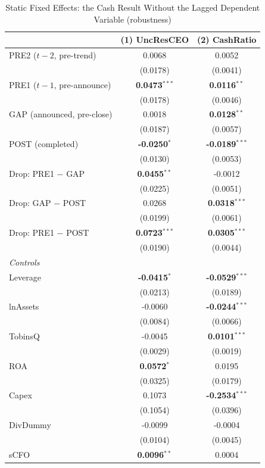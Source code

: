 \begin{table}[htbp]
\centering
\caption{Static Fixed Effects: the Cash Result Without the Lagged Dependent Variable (robustness)}
\label{tab:empire_drop_staticfe}
\scriptsize
\begin{tabular}{lcc}
\toprule
 & (1) UncResCEO & (2) CashRatio \\
\midrule
PRE2 ($t{-}2$, pre-trend) & 0.0068 & 0.0052 \\
 & (0.0178) & (0.0041) \\
PRE1 ($t{-}1$, pre-announce) & \textbf{0.0473}$^{***}$ & \textbf{0.0116}$^{**}$ \\
 & (0.0178) & (0.0046) \\
GAP (announced, pre-close) & 0.0018 & \textbf{0.0128}$^{**}$ \\
 & (0.0187) & (0.0057) \\
POST (completed) & \textbf{-0.0250}$^{*}$ & \textbf{-0.0189}$^{***}$ \\
 & (0.0130) & (0.0053) \\
\midrule
Drop: PRE1 $-$ GAP & \textbf{0.0455}$^{**}$ & -0.0012 \\
 & (0.0225) & (0.0051) \\
Drop: GAP $-$ POST & 0.0268 & \textbf{0.0318}$^{***}$ \\
 & (0.0199) & (0.0061) \\
Drop: PRE1 $-$ POST & \textbf{0.0723}$^{***}$ & \textbf{0.0305}$^{***}$ \\
 & (0.0190) & (0.0044) \\
\midrule
\multicolumn{3}{l}{\textit{Controls}} \\
Leverage & \textbf{-0.0415}$^{*}$ & \textbf{-0.0529}$^{***}$ \\
 & (0.0213) & (0.0189) \\
lnAssets & -0.0060 & \textbf{-0.0244}$^{***}$ \\
 & (0.0084) & (0.0066) \\
TobinsQ & -0.0045 & \textbf{0.0101}$^{***}$ \\
 & (0.0029) & (0.0019) \\
ROA & \textbf{0.0572}$^{*}$ & 0.0195 \\
 & (0.0325) & (0.0179) \\
Capex & 0.1073 & \textbf{-0.2534}$^{***}$ \\
 & (0.1054) & (0.0396) \\
DivDummy & -0.0099 & -0.0004 \\
 & (0.0104) & (0.0045) \\
sCFO & \textbf{0.0096}$^{**}$ & 0.0004 \\

\end{tabular}
\end{table}
